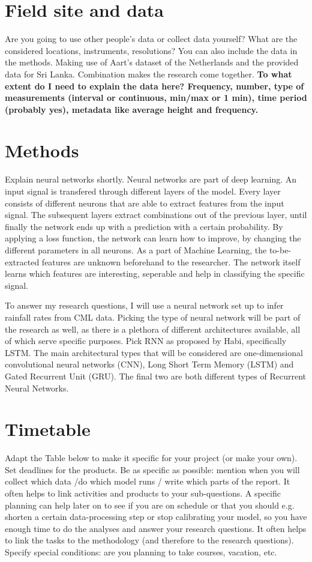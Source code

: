 \documentclass[twocolumn, 10pt, a4paper]{article}
\begin{document}
	
	\section{Field site and data}
	
	Are you going to use other people's data or collect data yourself? What are the considered locations, instruments, resolutions? You can also include the data in the methods.
	Making use of Aart's dataset of the Netherlands and the provided data for Sri Lanka. Combination makes the research come together. \textbf{To what extent do I need to explain the data here? Frequency, number, type of measurements (interval or continuous, min/max or 1 min), time period (probably yes), metadata like average height and frequency.}
	
	\section{Methods}
	Explain neural networks shortly.
	Neural networks are part of deep learning. An input signal is transfered through different layers of the model. Every layer consists of different neurons that are able to extract features from the input signal. The subsequent layers extract combinations out of the previous layer, until finally the network ends up with a prediction with a certain probability. By applying a loss function, the network can learn how to improve, by changing the different parameters in all neurons. As a part of Machine Learning, the to-be-extracted features are unknown beforehand to the researcher. The network itself learns which features are interesting, seperable and help in classifying the specific signal. 
	
	To answer my research questions, I will use a neural network set up to infer rainfall rates from CML data. Picking the type of neural network will be part of the research as well, as there is a plethora of different architectures available, all of which serve specific purposes. Pick RNN as proposed by Habi, specifically LSTM.
	The main architectural types that will be considered are one-dimensional convolutional neural networks (CNN), Long Short Term Memory (LSTM) and Gated Recurrent Unit (GRU). The final two are both different types of Recurrent Neural Networks. 
	
	
	\section{Timetable}
	
	Adapt the Table below to make it specific for your project (or make your own). Set deadlines for the products. Be as specific as possible: mention when you will collect which data /do which model runs / write which parts of the report. It often helps to link activities and products to your sub-questions. A specific planning can help later on to see if you are on schedule or that you should e.g. shorten a certain data-processing step or stop calibrating your model, so you have enough time to do the analyses and answer your research questions. It often helps to link the tasks to the methodology (and therefore to the research questions). Specify special conditions: are you planning to take courses, vacation, etc. 
	
\end{document}
